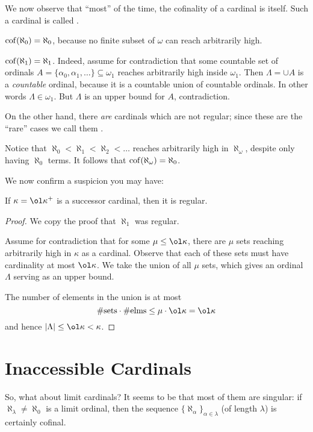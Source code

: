 We now observe that ``most'' of the time, the cofinality of a cardinal is itself.
Such a cardinal is called .
\begin{example}
	$\operatorname{cof}(\aleph_0) = \aleph_0$, because no finite subset of $\omega$ can reach arbitrarily high.
\end{example}
\begin{example}
	$\operatorname{cof}(\aleph_1) = \aleph_1$.
	Indeed, assume for contradiction that some countable
	set of ordinals $A = \{ \alpha_0, \alpha_1, \dots \} \subseteq \omega_1$
	reaches arbitrarily high inside $\omega_1$.
	Then $\Lambda = \cup A$ is a \emph{countable} ordinal,
	because it is a countable union of countable ordinals.
	In other words $\Lambda \in \omega_1$.
	But $\Lambda$ is an upper bound for $A$, contradiction.
\end{example}
On the other hand, there \emph{are} cardinals which are not regular;
since these are the ``rare'' cases we call them .
\begin{example}
	Notice that $\aleph_0 < \aleph_1 < \aleph_2 < \dots$ reaches
	arbitrarily high in $\aleph_\omega$, despite only having $\aleph_0$ terms.
	It follows that $\operatorname{cof}(\aleph_\omega) = \aleph_0$.
\end{example}

We now confirm a suspicion you may have:
\begin{theorem}
	If $\kappa = \ol\kappa^+$ is a successor cardinal,
	then it is regular.
\end{theorem}
\begin{proof}
	We copy the proof that $\aleph_1$ was regular.

	Assume for contradiction that for some $\mu \le \ol\kappa$,
	there are $\mu$ sets reaching arbitrarily high in $\kappa$ as a cardinal.
	Observe that each of these sets must have cardinality at most $\ol\kappa$.
	We take the union of all $\mu$ sets, which gives an ordinal $\Lambda$
	serving as an upper bound.

	The number of elements in the union is at most
	\[ \#\text{sets} \cdot \#\text{elms}
		\le \mu \cdot \ol\kappa = \ol\kappa \]
	and hence $\left\lvert \Lambda \right\rvert \le \ol\kappa < \kappa$.
\end{proof}

\section{Inaccessible Cardinals}
So, what about limit cardinals?
It seems to be that most of them are singular: if $\aleph_\lambda \ne \aleph_0$ is a limit ordinal,
then the sequence $\{\aleph_\alpha\}_{\alpha \in \lambda}$ (of length $\lambda$) is certainly cofinal.

